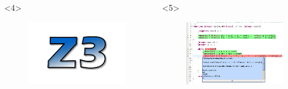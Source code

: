 \documentclass[t,svgnames]{beamer}
\begin{document}
\begin{frame}
\begin{columns}[c]
		
		

\begin{onlyenv}<4>
		\begin{figure}
			\includegraphics[width=\textwidth]{z3.png}
		\end{figure}
		
	\end{onlyenv}
	
			\begin{onlyenv}<5>

		\begin{figure}
			\includegraphics[width=\textwidth]{screenshot2.png}
		\end{figure}
	\end{onlyenv}
	
		\end{columns}


\end{frame}
\end{document}
